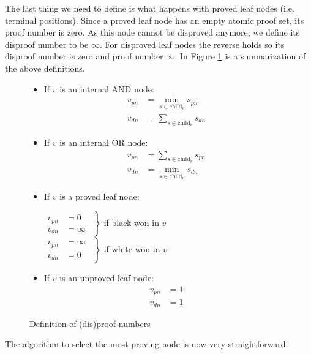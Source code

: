 \documentclass{article}
\begin{document}
The last thing we need to define is what happens with proved leaf nodes (i.e. terminal positions). Since a proved leaf node has an empty atomic proof set,
its proof number is zero. As this node cannot be disproved anymore, we define its disproof number to be $\infty$. For disproved leaf nodes the reverse holds
so its disproof number is zero and proof number $\infty$. In Figure \ref{pn:def} is a summarization of the above definitions.
\begin{figure}
\begin{itemize}
  \item If $v$ is an internal AND node:
    \begin{align*}
      v_{pn} &= \min_{s \in \text{child}_v} s_{pn}\\
      v_{dn} &= \sum_{s \in \text{child}_v} s_{dn}
    \end{align*}
  \item If $v$ is an internal OR node:
    \begin{align*}
      v_{pn} &= \sum_{s \in \text{child}_v} s_{pn}\\
      v_{dn} &= \min_{s \in \text{child}_v} s_{dn}
    \end{align*}
  \item If $v$ is a proved leaf node:\\
    \begin{center}
      $\left.
      \begin{aligned}
        v_{pn} &= 0 \quad \\
        v_{dn} &= \infty
      \end{aligned}
      \right\}$ if black won in $v$\\
      \hspace{0.7mm}$\left.
      \begin{aligned}
        v_{pn} &= \infty \\
        v_{dn} &= 0 \quad
      \end{aligned}
      \right\}$ if white won in $v$
    \end{center}
  \item If $v$ is an unproved leaf node:
    \begin{align*}
      v_{pn} &= 1 \\
      v_{dn} &= 1
    \end{align*}
\end{itemize}
\label{pn:def}
\caption{Definition of (dis)proof numbers}
\end{figure}

The algorithm to select the most proving node is now very straightforward.
\end{document}
